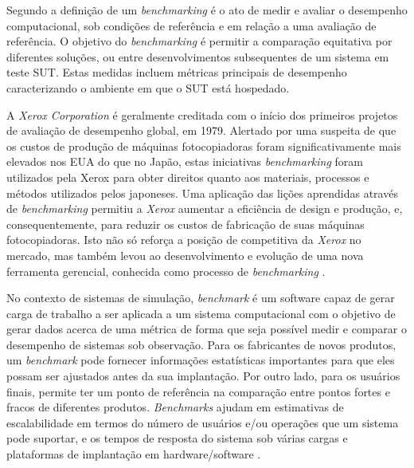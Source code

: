 Segundo  a definição de um \textit{benchmarking} é o ato de medir e avaliar o desempenho computacional, sob condições de referência e em relação a uma avaliação de referência. O objetivo do \textit{benchmarking} é permitir a comparação equitativa por diferentes soluções, ou entre desenvolvimentos subsequentes de um sistema em teste SUT. Estas medidas incluem métricas principais de desempenho caracterizando o ambiente em que o SUT está hospedado.

A \textit{Xerox Corporation} é geralmente creditada com o início dos primeiros projetos de avaliação de desempenho global, em 1979. Alertado por uma suspeita de que os custos de produção de máquinas fotocopiadoras foram significativamente mais elevados nos EUA do que no Japão, estas iniciativas \textit{benchmarking} foram utilizados pela Xerox para obter direitos quanto aos materiais, processos e métodos utilizados pelos japoneses. Uma aplicação das lições aprendidas através de \textit{benchmarking} permitiu a \textit{Xerox} aumentar a eficiência de design e produção, e, consequentemente, para reduzir os custos de fabricação de suas máquinas fotocopiadoras. Isto não só reforça a posição de competitiva da \textit{Xerox} no mercado, mas também levou ao desenvolvimento e evolução de uma nova ferramenta gerencial, conhecida como processo de \textit{benchmarking} \cite{Mahmoud2002}.

No contexto de sistemas de simulação, \textit{benchmark} é um software capaz de gerar carga de trabalho a ser aplicada a um sistema computacional com o objetivo de gerar dados acerca de uma métrica de forma que seja possível medir e comparar o desempenho de sistemas sob observação. Para os fabricantes de novos produtos, um \textit{benchmark} pode fornecer informações estatísticas importantes para que eles possam ser ajustados antes da sua implantação. Por outro lado, para os usuários finais, permite ter um ponto de referência na comparação entre pontos fortes e fracos de diferentes produtos. \textit{Benchmarks} ajudam em estimativas de escalabilidade em termos do número de usuários e/ou operações que um sistema pode suportar, e os tempos de resposta do sistema sob várias cargas e plataformas de implantação em hardware/software \cite{Jutla1999}.

